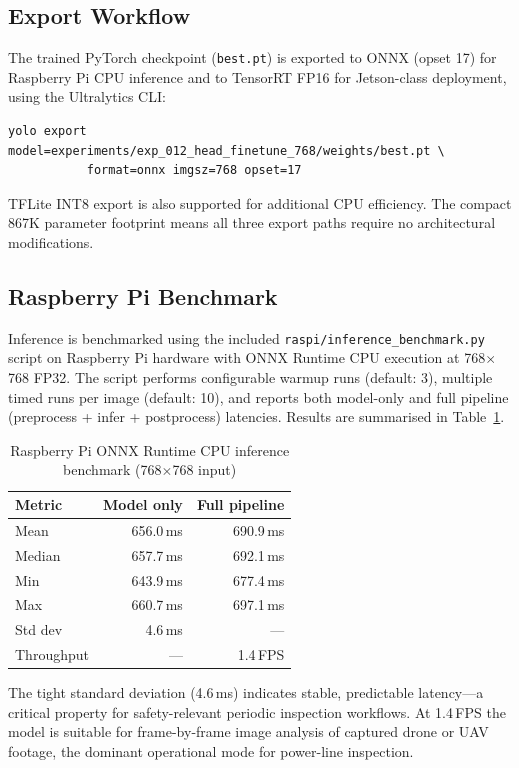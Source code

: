 \documentclass[11pt,a4paper]{article}
\begin{document}
\subsection{Export Workflow}

The trained PyTorch checkpoint (\texttt{best.pt}) is exported to ONNX (opset 17) for
Raspberry Pi CPU inference and to TensorRT FP16 for Jetson-class deployment, using the
Ultralytics CLI:
\begin{verbatim}
yolo export model=experiments/exp_012_head_finetune_768/weights/best.pt \
           format=onnx imgsz=768 opset=17
\end{verbatim}
TFLite INT8 export is also supported for additional CPU efficiency. The compact 867K
parameter footprint means all three export paths require no architectural
modifications.

\subsection{Raspberry Pi Benchmark}

Inference is benchmarked using the included
\texttt{raspi/inference\_benchmark.py} script on Raspberry Pi hardware with ONNX
Runtime CPU execution at 768$\times$768 FP32. The script performs configurable warmup
runs (default: 3), multiple timed runs per image (default: 10), and reports both
model-only and full pipeline (preprocess + infer + postprocess) latencies.
Results are summarised in Table~\ref{tab:raspi}.

\begin{table}[H]
\centering
\caption{Raspberry Pi ONNX Runtime CPU inference benchmark (768$\times$768 input)}
\label{tab:raspi}
\begin{tabular}{lrr}
\toprule
\textbf{Metric} & \textbf{Model only} & \textbf{Full pipeline} \\
\midrule
Mean     & 656.0\,ms & 690.9\,ms \\
Median   & 657.7\,ms & 692.1\,ms \\
Min      & 643.9\,ms & 677.4\,ms \\
Max      & 660.7\,ms & 697.1\,ms \\
Std dev  &   4.6\,ms & ---       \\
Throughput & ---     & 1.4\,FPS  \\
\bottomrule
\end{tabular}
\end{table}

The tight standard deviation (4.6\,ms) indicates stable, predictable latency---a
critical property for safety-relevant periodic inspection workflows. At 1.4\,FPS the
model is suitable for frame-by-frame image analysis of captured drone or UAV footage,
the dominant operational mode for power-line inspection.
\end{document}
